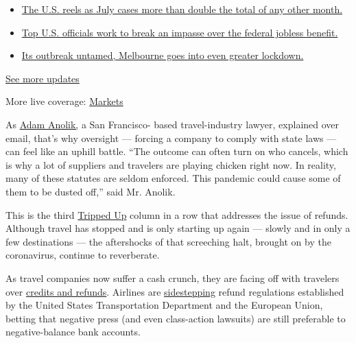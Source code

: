 \begin{itemize}
\tightlist
\item
  \href{https://www.nytimes.com/2020/08/01/world/coronavirus-covid-19.html?action=click\&pgtype=Article\&state=default\&region=MAIN_CONTENT_1\&context=storylines_live_updates\#link-34047410}{The
  U.S. reels as July cases more than double the total of any other
  month.}
\item
  \href{https://www.nytimes.com/2020/08/01/world/coronavirus-covid-19.html?action=click\&pgtype=Article\&state=default\&region=MAIN_CONTENT_1\&context=storylines_live_updates\#link-780ec966}{Top
  U.S. officials work to break an impasse over the federal jobless
  benefit.}
\item
  \href{https://www.nytimes.com/2020/08/01/world/coronavirus-covid-19.html?action=click\&pgtype=Article\&state=default\&region=MAIN_CONTENT_1\&context=storylines_live_updates\#link-2bc8948}{Its
  outbreak untamed, Melbourne goes into even greater lockdown.}
\end{itemize}

\href{https://www.nytimes.com/2020/08/01/world/coronavirus-covid-19.html?action=click\&pgtype=Article\&state=default\&region=MAIN_CONTENT_1\&context=storylines_live_updates}{See
more updates}

More live coverage:
\href{https://www.nytimes.com/live/2020/07/31/business/stock-market-today-coronavirus?action=click\&pgtype=Article\&state=default\&region=MAIN_CONTENT_1\&context=storylines_live_updates}{Markets}

As \href{https://travellaw.com/}{Adam Anolik,} a San Francisco- based
travel-industry lawyer, explained over email, that's why oversight ---
forcing a company to comply with state laws --- can feel like an uphill
battle. ``The outcome can often turn on who cancels, which is why a lot
of suppliers and travelers are playing chicken right now. In reality,
many of these statutes are seldom enforced. This pandemic could cause
some of them to be dusted off,'' said Mr. Anolik.

This is the third
\href{https://www.nytimes.com/column/tripped-up}{Tripped Up} column in a
row that addresses the issue of refunds. Although travel has stopped and
is only starting up again --- slowly and in only a few destinations ---
the aftershocks of that screeching halt, brought on by the coronavirus,
continue to reverberate.

As travel companies now suffer a cash crunch, they are facing off with
travelers over
\href{https://www.nytimes.com/2020/05/12/travel/refunds-or-credits-travelers-and-businesses-face-off.html}{credits
and refunds}. Airlines are
\href{https://www.nytimes.com/2020/05/01/travel/trip-refund-airlines.html}{sidestepping}
refund regulations established by the United States Transportation
Department and the European Union, betting that negative press (and even
class-action lawsuits) are still preferable to negative-balance bank
accounts.

